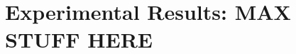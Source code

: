 \documentclass[journal,transmag]{IEEEtran}
\begin{document}
%



\section{Experimental Results: MAX STUFF HERE}
\end{document}
